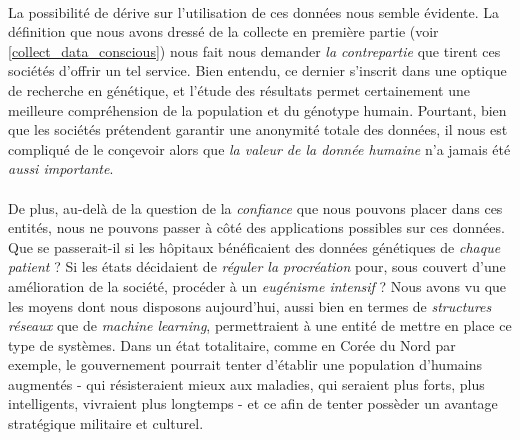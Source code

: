 \paragraph{} La possibilité de dérive sur l'utilisation de ces données nous semble évidente. La définition
que nous avons dressé de la collecte en première partie (voir \ref{collect_data_conscious}) nous fait nous 
demander \emph{la contrepartie} que tirent ces sociétés d'offrir un tel service. Bien entendu, ce dernier 
s'inscrit dans une optique de recherche en génétique, et l'étude des résultats permet certainement une
meilleure compréhension de la population et du génotype humain. Pourtant, bien que les sociétés prétendent
garantir une anonymité totale des données, il nous est compliqué de le conçevoir alors que \emph{la valeur
de la donnée humaine} n'a jamais été \emph{aussi importante}. 

\paragraph{} De plus, au-delà de la question de la \emph{confiance} que nous pouvons placer dans ces entités,
nous ne pouvons passer à côté des applications possibles sur ces données. Que se passerait-il si les hôpitaux
bénéficaient des données génétiques de \emph{chaque patient} ? Si les états décidaient de \emph{réguler la
procréation} pour, sous couvert d'une amélioration de la société, procéder à un \emph{eugénisme intensif} ?
Nous avons vu que les moyens dont nous disposons aujourd'hui, aussi bien en termes de \emph{structures réseaux}
que de \emph{machine learning}, permettraient à une entité de mettre en place ce type de systèmes. Dans un état
totalitaire, comme en Corée du Nord par exemple, le gouvernement pourrait tenter d'établir une population
d'humains augmentés - qui résisteraient mieux aux maladies, qui seraient plus forts, plus intelligents, vivraient
plus longtemps - et ce afin de tenter possèder un avantage stratégique militaire et culturel.

